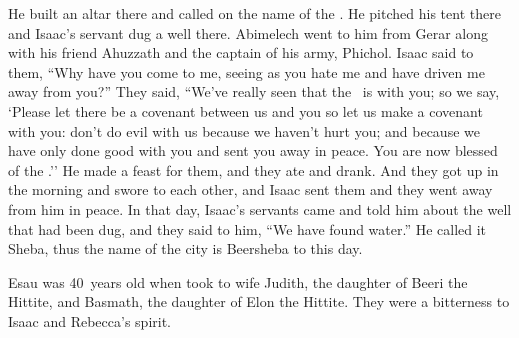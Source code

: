 \begin{inparaenum}
   He built an altar there and called on the name of the \lord. He pitched his tent there and Isaac's servant dug a well there.%
   Abimelech went to him from Gerar along with his friend Ahuzzath and the captain of his army, Phichol.%
   Isaac said to them, ``Why have you come to me, seeing as you hate me and have driven me away from you?''%
   They said, ``We've really seen that the \lord\ is with you; so we say, `Please let there be a covenant between us and you so let us make a covenant with you:%
   don't do evil with us because we haven't hurt you; and because we have only done good with you and sent you away in peace. You are now blessed of the \lord.''%
   He made a feast for them, and they ate and drank.%
   And they got up in the morning and swore to each other, and Isaac sent them and they went away from him in peace.%
   In that day, Isaac's servants came and told him about the well that had been dug, and they said to him, ``We have found water.''%
   He called it Sheba, thus the name of the city is Beersheba to this day.%

   Esau was 40~years old when took to wife Judith, the daughter of Beeri the Hittite, and Basmath, the daughter of Elon the Hittite.%
   They were a bitterness to Isaac and Rebecca's spirit.%
\end{inparaenum}
